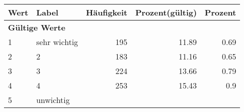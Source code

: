      \begin{longtable}{lXrrr}
     \toprule
     \textbf{Wert} & \textbf{Label} & \textbf{Häufigkeit} & \textbf{Prozent(gültig)} & \textbf{Prozent} \\
     \endhead
     \midrule
     \multicolumn{5}{l}{\textbf{Gültige Werte}}\\

     1 &
     \multicolumn{1}{X}{ sehr wichtig   } &


       \num{195} &
       \num[round-mode=places,round-precision=2]{11,89} &
         \num[round-mode=places,round-precision=2]{0,69} \\

     2 &
     \multicolumn{1}{X}{ 2   } &


       \num{183} &
       \num[round-mode=places,round-precision=2]{11,16} &
         \num[round-mode=places,round-precision=2]{0,65} \\

     3 &
     \multicolumn{1}{X}{ 3   } &


       \num{224} &
       \num[round-mode=places,round-precision=2]{13,66} &
         \num[round-mode=places,round-precision=2]{0,79} \\

     4 &
     \multicolumn{1}{X}{ 4   } &


       \num{253} &
       \num[round-mode=places,round-precision=2]{15,43} &
         \num[round-mode=places,round-precision=2]{0,9} \\

     5 &
     \multicolumn{1}{X}{ unwichtig   } &



\end{longtable}
